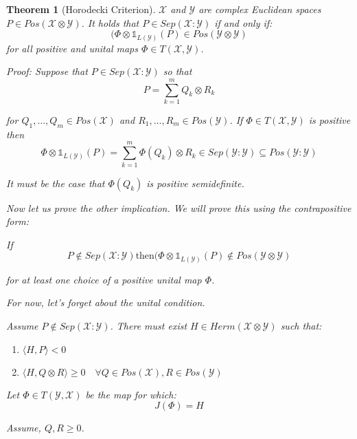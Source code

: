 \documentclass{article}
\newtheorem{theorem}{Theorem}
\begin{document}
\begin{theorem}[Horodecki Criterion]
$\mathcal{X}$ and $\mathcal{Y}$ are complex Euclidean spaces 
        $P \in Pos(\mathcal{X} \otimes \mathcal{Y})$. It holds that $P \in
    Sep(\mathcal{X}:\mathcal{Y})$ if and only if:
    \[ 
            (\Phi \otimes \mathds{1}_{L(\mathcal{Y})}(P) \in Pos(\mathcal{Y}
                \otimes \mathcal{Y}) 
    \]
    for all positive and unital maps $\Phi \in T(\mathcal{X},\mathcal{Y})$.

    Proof: Suppose that $P \in Sep(\mathcal{X}:\mathcal{Y})$ so that 
    \[ 
            P = \sum_{k=1}^m Q_k \otimes R_k 
    \]
    
    for $Q_1, \ldots, Q_m \in Pos(\mathcal{X})$ and $R_1,\ldots,R_m \in
    Pos(\mathcal{Y})$. If $\Phi \in T(\mathcal{X},\mathcal{Y})$ is positive then
    \[ 
            \Phi \otimes \mathds{1}_{L(\mathcal{Y})}(P) = \sum_{k=1}^m \Phi(Q_k)
            \otimes R_k \in Sep(\mathcal{Y}:\mathcal{Y}) \subseteq
            Pos(\mathcal{Y}:\mathcal{Y}) 
    \]
    
    It must be the case that $\Phi(Q_k)$ is positive semidefinite.

    Now let us prove the other implication. We will prove this using the
    contrapositive form:

    If
    \[ 
            P\notin Sep(\mathcal{X}:\mathcal{Y}) \text{then} (\Phi \otimes
                \mathds{1}_{L(\mathcal{Y})}(P) \notin Pos(\mathcal{Y}\otimes
                \mathcal{Y}) 
    \]

    for at least one choice of a positive unital map $\Phi$.
    
    For now, let's forget about the unital condition.

    Assume $P \notin Sep(\mathcal{X}:\mathcal{Y})$. There must exist $H \in
    Herm(\mathcal{X}\otimes \mathcal{Y})$ such that:

    \begin{enumerate}
        \item $\langle H , P \rangle < 0$
        \item $\langle H , Q \otimes R \rangle \ge 0 \quad \forall Q\in
            Pos(\mathcal{X}) , R \in Pos(\mathcal{Y})$
    \end{enumerate}
    
    Let $\Phi \in T(\mathcal{Y},\mathcal{X})$ be the map for which:
    \[ 
            J(\Phi) = H 
    \]
    
    Assume, $Q, R \ge 0$.


\end{theorem}
\end{document}
